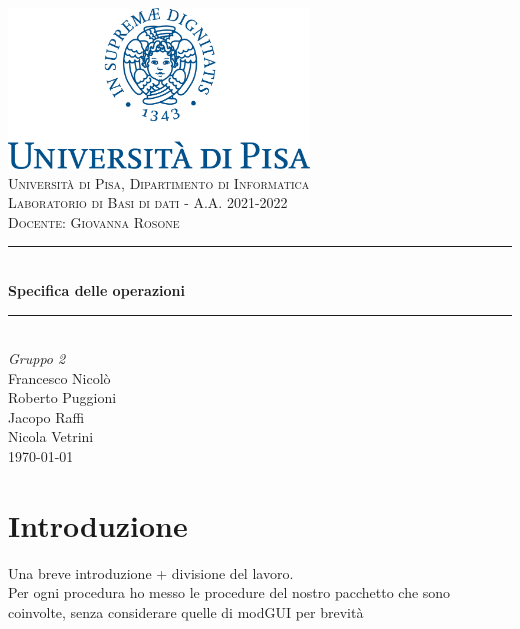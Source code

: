 \documentclass[a4paper,11pt]{article}
\newcommand{\HRule}{\rule{\linewidth}{0.5mm}} 	%
\begin{document}
\begin{titlepage}
\center
\includegraphics[width=0.6\textwidth]{img/unipi-logo.png}\\[1cm]

\textsc{\LARGE Università di Pisa, Dipartimento di Informatica}\\[1cm]

\textsc{\Large Laboratorio di Basi di dati - A.A. 2021-2022}\\[0.2cm]
\textsc{\large Docente: Giovanna Rosone}\\[1cm]

\HRule \\[0.8cm]
{ \huge \bfseries Specifica delle operazioni}\\[0.7cm]
\HRule \\[2cm]

\Huge \emph{Gruppo 2}\\[0.5cm]
\large Francesco Nicolò\\Roberto Puggioni\\Jacopo Raffi\\Nicola Vetrini\\[1.5cm]
{\large \today}\\[5cm]

\vfill
\end{titlepage}

\clearpage
\tableofcontents
\clearpage

\section{Introduzione}
Una breve introduzione + divisione del lavoro. \\
Per ogni procedura ho messo le procedure del nostro pacchetto che sono coinvolte, senza
considerare quelle di modGUI per brevità


\clearpage


\clearpage


\end{document}
